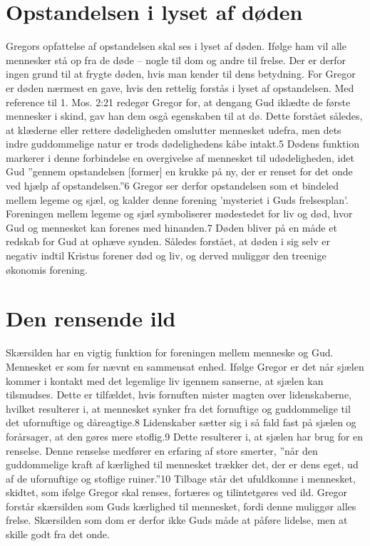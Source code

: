 \section{Opstandelsen i lyset af døden}
Gregors opfattelse af opstandelsen skal ses i lyset af døden. Ifølge ham vil alle mennesker stå op fra de døde -- nogle til dom og andre til frelse. Der er derfor ingen grund til at frygte døden, hvis man kender til dens betydning. For Gregor er døden nærmest en gave, hvis den rettelig forstås i lyset af opstandelsen. Med reference til 1. Mos. 2:21 redegør Gregor for, at dengang Gud iklædte de første mennesker i skind, gav han dem osgå egenskaben til at dø. Dette forstået således, at klæderne eller rettere dødeligheden omslutter mennesket udefra, men dets indre guddommelige natur er trods dødelighedens kåbe intakt.5 Dødens funktion markerer i denne forbindelse en overgivelse af mennesket til udødeligheden, idet Gud ”gennem opstandelsen [former] en krukke på ny, der er renset for det onde ved hjælp af opstandelsen.”6 Gregor ser derfor opstandelsen som et bindeled mellem legeme og sjæl, og kalder denne forening 'mysteriet i Guds frelsesplan'. Foreningen mellem legeme og sjæl symboliserer mødestedet for liv og død, hvor Gud og mennesket kan forenes med hinanden.7 Døden bliver på en måde et redskab for Gud at ophæve synden. Således forstået, at døden i sig selv er negativ indtil Kristus forener død og liv, og derved muliggør den treenige økonomis forening.

\section{Den rensende ild}
Skærsilden har en vigtig funktion for foreningen mellem menneske og Gud. Mennesket er som før nævnt en sammensat enhed. Ifølge Gregor er det når sjælen kommer i kontakt med det legemlige liv igennem sanserne, at sjælen kan tilsmudses. Dette er tilfældet, hvis fornuften mister magten over lidenskaberne, hvilket resulterer i, at mennesket synker fra det fornuftige og guddommelige til det ufornuftige og dåreagtige.8 Lidenskaber sætter sig i så fald fast på sjælen og forårsager, at den gøres mere stoflig.9 Dette resulterer i, at sjælen har brug for en renselse. Denne renselse medfører en erfaring af store smerter, ”når den guddommelige kraft af kærlighed til mennesket trækker det, der er dens eget, ud af de ufornuftige og stoflige ruiner.”10 Tilbage står det ufuldkomne i mennesket, skidtet, som ifølge Gregor skal renses, fortæres og tilintetgøres ved ild. Gregor forstår skærsilden som Guds kærlighed til mennesket, fordi denne muliggør alles frelse. Skærsilden som dom er derfor ikke Guds måde at påføre lidelse, men at skille godt fra det onde.

